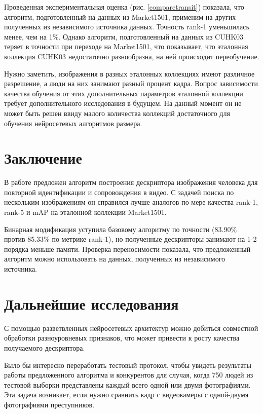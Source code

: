 \documentclass[a4paper]{article}
\begin{document}
\begin{multicols*}{2}
Проведенная экспериментальная оценка (рис. \ref{comparetransit}) показала, что алгоритм, подготовленный на данных из Market1501, применим на других полученных из независимого источника данных. Точность rank-1 уменьшилась менее, чем на 1\%. Однако алгоритм, подготовленный на данных из CUHK03 теряет в точности при переходе на Market1501, что показывает, что эталонная коллекция CUHK03 недостаточно разнообразна, на ней происходит переобучение.

Нужно заметить, изображения в разных эталонных коллекциях имеют различное разрешение, а люди на них занимают разный процент кадра. Вопрос зависимости качества обучения от этих дополнительных параметров эталонной коллекции требует дополнительного исследования в будущем. На данный момент он не может быть решен ввиду малого количества коллекций достаточного для обучения нейросетевых алгоритмов размера.

\section{Заключение}

В работе предложен алгоритм построения дескриптора изображения человека для повторной идентификации и сопровождения в видео. С задачей поиска по нескольким изображениям он справился лучше аналогов по мере качества rank-1, rank-5 и mAP на эталонной коллекции Market1501.

Бинарная модификация уступила базовому алгоритму по точности (83.90\% против 85.33\% по метрике rank-1), но полученные дескрипторы занимают на 1-2 порядка меньше памяти. Проверка переносимости показала, что предложенный алгоритм можно использовать на данных, полученных из независимого источника.

\section{Дальнейшие исследования}

С помощью разветвленных нейросетевых архитектур можно добиться совместной обработки разноуровневых признаков, что может привести к росту качества получаемого дескриптора.

Было бы интересно переработать тестовый протокол, чтобы увидеть результаты работы предложенного алгоритма и конкурентов для случая, когда 750 людей из тестовой выборки представлены каждый всего одной или двумя фотографиями. Эта задача возникает, если нужно сравнить кадр с видеокамеры с одной-двумя фотографиями преступников.


\end{multicols*}
\end{document}
